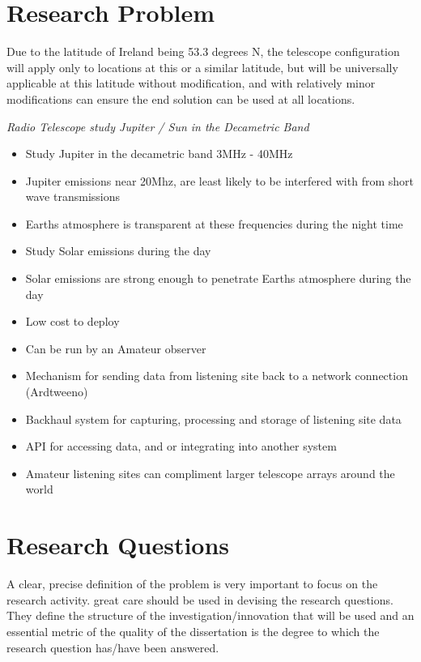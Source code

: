 \documentclass[runningheads,a4paper]{llncs}
\begin{document}
\section*{Research Problem}
%
Due to the latitude of Ireland being 53.3 degrees N, the telescope configuration will apply only to locations at this or a similar latitude, but will be universally applicable at this latitude without modification, and with relatively minor modifications can ensure the end solution can be used at all locations. 

\textit{Radio Telescope study Jupiter / Sun in the Decametric Band}

\begin{itemize}
  \item Study Jupiter in the decametric band 3MHz - 40MHz
  \item Jupiter emissions near 20Mhz, are least likely to be interfered with from short wave transmissions
  \item Earths atmosphere is transparent at these frequencies during the night time
  \item Study Solar emissions during the day
  \item Solar emissions are strong enough to penetrate Earths atmosphere during the day
\end{itemize}


\begin{itemize}
  \item Low cost to deploy
  \item Can be run by an Amateur observer
  \item Mechanism for sending data from listening site back to a network connection (Ardtweeno)
  \item Backhaul system for capturing, processing and storage of listening site data
  \item API for accessing data, and or integrating into another system
  \item Amateur listening sites can compliment larger telescope arrays around the world
\end{itemize}


%
%
\newpage
\section*{Research Questions}
A clear, precise definition of the problem is very important to focus on the research activity. great care should be used in devising the research questions. They define the structure of the investigation/innovation that will be used and an essential metric of the quality of the dissertation is the degree to which the research question has/have been answered.
\end{document}
